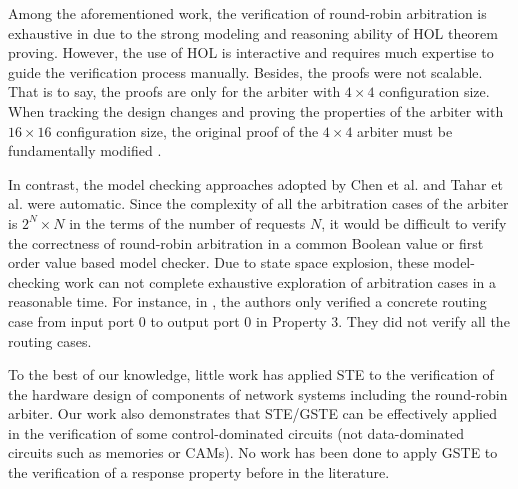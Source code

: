 \documentclass[final]{IEEEtran}
\begin{document}
Among the aforementioned work, the verification of round-robin
arbitration is exhaustive in \cite{Paul94, PaulTech94} due to the
strong modeling and reasoning ability of HOL theorem proving.
However, the use of HOL is interactive and requires much expertise
to guide the verification process manually. Besides, the proofs were
not scalable. That is to say, the proofs are only for the arbiter
with $4 \times 4$ configuration size. When tracking the design
changes and proving the properties of the arbiter with $16 \times
16$ configuration size, the original proof of the $4 \times 4$
arbiter must be fundamentally modified \cite{CurzonATM}.%

 In contrast, the model checking approaches adopted by Chen et al. and Tahar et al. were
automatic. Since the complexity of all the arbitration cases of the
arbiter is $2^{N}\times N$ in the terms of the number of requests
$N$, it would be difficult to verify the correctness of round-robin
arbitration in a common Boolean value or first order value based
model checker. Due to state space explosion, these model-checking
work can not complete exhaustive exploration of arbitration cases in a reasonable time.
For instance, in \cite{DBLP:journals/tcad/TaharSCZLM99}, the authors
only verified a concrete routing case from input port 0 to output
port 0 in Property 3. They did not verify all the routing cases.

To the best of our knowledge, little work has applied STE to the
verification of the hardware design of components of network systems
including the round-robin arbiter. Our work also demonstrates that
STE/GSTE can be effectively applied in the verification of some
control-dominated circuits (not data-dominated circuits such as
memories or CAMs). No work has been done to apply GSTE to the
verification of a response property before in the literature.

\end{document}
